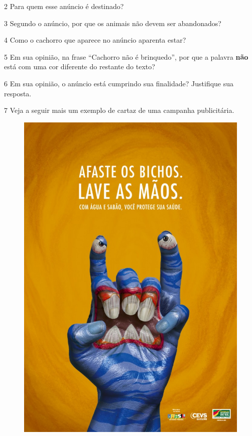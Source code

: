 \num{2} Para quem esse anúncio é destinado? 


\num{3} Segundo o anúncio, por que os animais não devem ser abandonados? 


\num{4} Como o cachorro que aparece no anúncio aparenta estar?



\num{5} Em sua opinião, na frase ``Cachorro não é brinquedo'', por que a palavra \textbf{não} está com uma cor diferente do restante do texto?


\num{6} Em sua opinião, o anúncio está cumprindo sua finalidade? Justifique
sua resposta. 


\num{7} Veja a seguir mais um exemplo de cartaz de uma campanha publicitária.


\begin{figure}[htpb!]
\centering
\includegraphics[width=.7\textwidth]{./media/image10.jpeg}
\end{figure}

